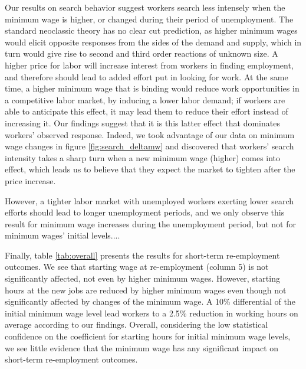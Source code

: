 \documentclass{article}
\begin{document}
Our results on search behavior suggest workers search less intensely when the minimum wage is higher, or changed during their period of unemployment. The standard neoclassic theory has no clear cut prediction, as higher minimum wages would elicit opposite responses from the sides of the demand and supply, which in turn would give rise to second and third order reactions of unknown size. A higher price for labor will increase interest from workers in finding employment, and therefore should lead to added effort put in looking for work. At the same time, a higher minimum wage that is binding would reduce work opportunities in a competitive labor market, by inducing a lower labor demand; if workers are able to anticipate this effect, it may lead them to reduce their effort instead of increasing it. Our findings suggest that it is this latter effect that dominates workers' observed response. Indeed, we took advantage of our data on minimum wage changes in figure \ref{fig:search_deltamw} and discovered that workers' search intensity takes a sharp turn when a new minimum wage (higher) comes into effect, which leads us to believe that they expect the market to tighten after the price increase.

However, a tighter labor market with unemployed workers exerting lower search efforts should lead to longer unemployment periods, and we only observe this result for minimum wage increases during the unemployment period, but not for minimum wages' initial levels.... 

Finally, table \ref{tab:overall} presents the results for short-term re-employment outcomes. We see that starting wage at re-employment (column 5) is not significantly affected, not even by higher minimum wages. However, starting hours at the new jobs are reduced by higher minimum wages even though not significantly affected by changes of the minimum wage. A 10\% differential of the initial minimum wage level lead workers to a 2.5\% reduction in working hours on average according to our findings. Overall, considering the low statistical confidence on the coefficient for starting hours for initial minimum wage levels, we see little evidence that the minimum wage has any significant impact on short-term re-employment outcomes.
\end{document}
